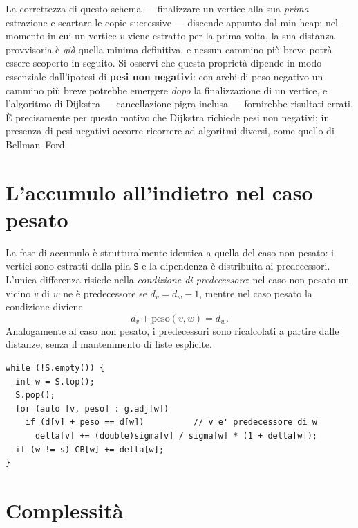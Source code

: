 \documentclass[11pt,a4paper]{report}
\begin{document}
La correttezza di questo schema --- finalizzare un vertice alla sua \emph{prima}
estrazione e scartare le copie successive --- discende appunto
dal min-heap: nel momento in cui un vertice $v$ viene estratto per la
prima volta, la sua distanza provvisoria è \emph{già} quella minima definitiva, e
nessun cammino più breve potrà essere scoperto in seguito.
Si osservi che questa proprietà dipende in modo essenziale dall'ipotesi di
\textbf{pesi non negativi}: con archi di peso negativo un cammino più breve
potrebbe emergere \emph{dopo} la finalizzazione di un vertice, e l'algoritmo di
Dijkstra --- cancellazione pigra inclusa --- fornirebbe risultati errati. È
precisamente per questo motivo che Dijkstra richiede pesi non negativi; in
presenza di pesi negativi occorre ricorrere ad algoritmi diversi, come quello di
Bellman--Ford.

\section{L'accumulo all'indietro nel caso pesato}

La fase di accumulo è strutturalmente identica a quella del caso non pesato: i
vertici sono estratti dalla pila \texttt{S} e la dipendenza è distribuita ai
predecessori. L'unica differenza risiede nella \emph{condizione di predecessore}:
nel caso non pesato un vicino $v$ di $w$ ne è predecessore se $d_v = d_w - 1$,
mentre nel caso pesato la condizione diviene
\begin{equation}
	d_v + \text{peso}(v,w) = d_w .
\end{equation}
Analogamente al caso non pesato, i predecessori sono ricalcolati a partire dalle
distanze, senza il mantenimento di liste esplicite.

\noindent\begin{minipage}{\linewidth}
	\begin{lstlisting}[caption={Accumulo pesato: cambia solo la condizione di
predecessore.}]
while (!S.empty()) {
  int w = S.top();
  S.pop();
  for (auto [v, peso] : g.adj[w])
    if (d[v] + peso == d[w])          // v e' predecessore di w
      delta[v] += (double)sigma[v] / sigma[w] * (1 + delta[w]);
  if (w != s) CB[w] += delta[w];
}
\end{lstlisting}
\end{minipage}

\section{Complessità}
\end{document}
